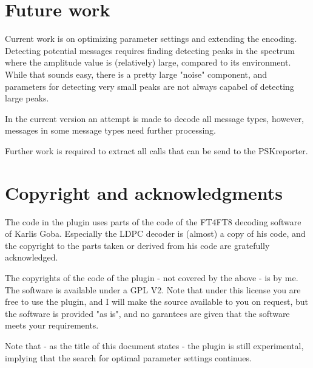\documentclass[11pt]{article}
\begin{document}
\section{Future work}
Current work is on optimizing 
parameter settings and extending the encoding.
Detecting potential messages requires finding detecting peaks in the spectrum
where the amplitude value is (relatively) large, compared to its environment.
While that sounds easy, there is a pretty large "noise" component,
and parameters for detecting very small peaks are not always capabel of
detecting large peaks.
\par
In the current version an attempt is made to decode all message types,
however, messages in some message types need further processing.
\par
Further work is required to extract all calls that can be send to the PSKreporter.
\section{Copyright and acknowledgments}

The code in the plugin uses parts of the code of the FT4FT8 decoding
software of Karlis Goba.
Especially the LDPC decoder is (almost) a copy of his code, and the copyright
to the parts taken or derived from his code are gratefully acknowledged.

The copyrights of the code of the plugin - not covered by the above -
is by me.
The software is available under a GPL V2.
Note that under this license you are free to use the plugin, and
I will make the source available to you on request,  but the software is provided "as is",
and no garantees are given that the software meets your requirements.
\par
Note that - as the title of this document states - the plugin is still
experimental, implying that the search for optimal parameter settings continues.
\end{document}
